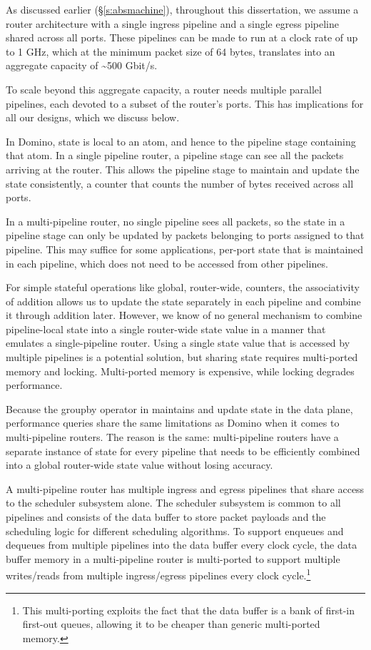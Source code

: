 As discussed earlier (\S\ref{s:absmachine}), throughout this dissertation, we
assume a router architecture with a single ingress pipeline and a single egress
pipeline shared across all ports. These pipelines can be made to run at a clock
rate of up to 1 GHz, which at the minimum packet size of 64 bytes, translates
into an aggregate capacity of \textasciitilde500 Gbit/s.

To scale beyond this aggregate capacity, a router needs multiple parallel
pipelines, each devoted to a subset of the router's ports. This has
implications for all our designs, which we discuss below.

 In Domino, state is local to an atom, and hence to the pipeline
stage containing that atom.  In a single pipeline router, a pipeline stage can
see all the packets arriving at the router. This allows the pipeline stage to
maintain and update the state consistently, \eg a counter that counts the
number of bytes received across all ports.

In a multi-pipeline router, no single pipeline sees all packets, so the state
in a pipeline stage can only be updated by packets belonging to ports assigned
to that pipeline. This may suffice for some applications, \eg per-port state
that is maintained in each pipeline, which does not need to be accessed from
other pipelines. 

For simple stateful operations like global, router-wide, counters, the
associativity of addition allows us to update the state separately in each
pipeline and combine it through addition later. However, we know of no general
mechanism to combine pipeline-local state into a single router-wide state value
in a manner that emulates a single-pipeline router. Using a single state value
that is accessed by multiple pipelines is a potential solution, but sharing
state requires multi-ported memory and locking. Multi-ported memory is
expensive, while locking degrades performance.

 Because the {\ct groupby} operator in \TheSystem
maintains and update state in the data plane, performance queries share the
same limitations as Domino when it comes to multi-pipeline routers. The reason
is the same: multi-pipeline routers have a separate instance of state for every
pipeline that needs to be efficiently combined into a global router-wide state
value without losing accuracy.

 A multi-pipeline router has multiple ingress and egress pipelines
that share access to the scheduler subsystem alone. The scheduler subsystem is
common to all pipelines and consists of the data buffer to store packet
payloads and the scheduling logic for different scheduling algorithms. To
support enqueues and dequeues from multiple pipelines into the data buffer
every clock cycle, the data buffer memory in a multi-pipeline router is
multi-ported to support multiple writes/reads from multiple ingress/egress
pipelines every clock cycle.\footnote{This multi-porting exploits the fact that
the data buffer is a bank of first-in first-out queues, allowing it to be
cheaper than generic multi-ported memory.}

